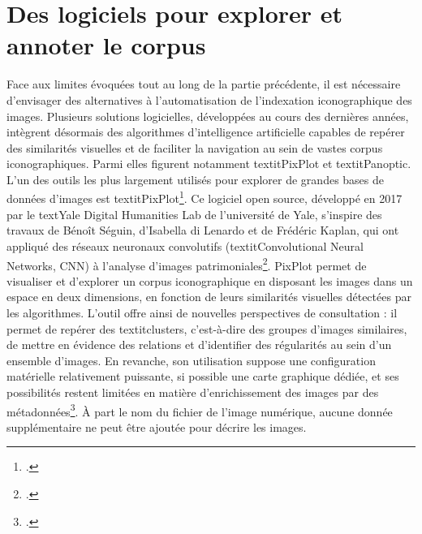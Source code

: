 \section[Des logiciels]{Des logiciels pour explorer et annoter le corpus}

Face aux limites évoquées tout au long de la partie précédente, il est nécessaire d’envisager des alternatives à l’automatisation de l’indexation iconographique des images. Plusieurs solutions logicielles, développées au cours des dernières années, intègrent désormais des algorithmes d’intelligence artificielle capables de repérer des similarités visuelles et de faciliter la navigation au sein de vastes corpus iconographiques. Parmi elles figurent notamment textit{PixPlot} et textit{Panoptic}.
L’un des outils les plus largement utilisés pour explorer de grandes bases de données d’images est textit{PixPlot}\footcite{dhlabyalePixPlot}. Ce logiciel open source, développé en 2017 par le text{Yale Digital Humanities Lab} de l’université de Yale, s’inspire des travaux de Bénoît Séguin, d’Isabella di Lenardo et de Frédéric Kaplan, qui ont appliqué des réseaux neuronaux convolutifs (textit{Convolutional Neural Networks}, CNN) à l’analyse d’images patrimoniales\footcite{dilenardoVisualPatternsDiscovery2016}. PixPlot permet de visualiser et d’explorer un corpus iconographique en disposant les images dans un espace en deux dimensions, en fonction de leurs similarités visuelles détectées par les algorithmes. L’outil offre ainsi de nouvelles perspectives de consultation : il permet de repérer des textit{clusters}, c’est-à-dire des groupes d’images similaires, de mettre en évidence des relations et d’identifier des régularités au sein d’un ensemble d’images. En revanche, son utilisation suppose une configuration matérielle relativement puissante, si possible une carte graphique dédiée, et ses possibilités restent limitées en matière d’enrichissement des images par des métadonnées\footcite{duhaimePixPlotDepotGithub2018}. À part le nom du fichier de l’image numérique, aucune donnée supplémentaire ne peut être ajoutée pour décrire les images.

